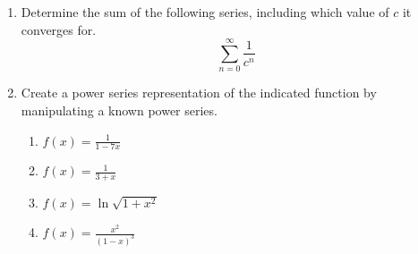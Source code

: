 \documentclass{article}
\begin{document}
\begin{itemize}
\begin{enumerate}
                    \item Determine the sum of the following series, including which value of $c$ it converges for.  $$\displaystyle \sum_{n=0}^\infty \frac{1}{c^n}$$
                    \item Create a power series representation of the indicated function by manipulating a known power series.
                        \begin{enumerate}
                            \item $\displaystyle f(x)=\frac{1}{1-7x}$
                            \item $\displaystyle f(x)=\frac{1}{3+x}$
                            \item $\displaystyle f(x)=\ln \sqrt{1+x^2}$
                            \item $\displaystyle f(x)=\frac{x^2}{(1-x)^3}$
                        \end{enumerate}
                \end{enumerate}
        \end{itemize}
\end{document}
